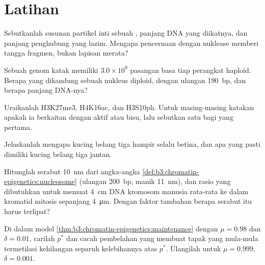 \section{Latihan}

\begin{exercise}[$\star$]\label{exo:b3:chromatin-epigenetics:1}
Sebutkanlah susunan partikel inti sebuah , panjang DNA yang
diikatnya, dan panjang penghubung yang lazim. Mengapa pencernaan 
dengan nuklease memberi tangga fragmen, bukan lapisan merata?
\end{exercise}

\begin{exercise}[$\star$]\label{exo:b3:chromatin-epigenetics:2}
Sebuah genom katak memiliki $3.0\times 10^{9}$ pasangan basa tiap perangkat
haploid. Berapa  yang dikandung sebuah nukleus diploid, dengan
ulangan \qty{190}{bp}, dan berapa panjang DNA-nya?
\end{exercise}

\begin{exercise}[$\star$]\label{exo:b3:chromatin-epigenetics:3}
Uraikanlah H3K27me3, H4K16ac, dan H3S10ph. Untuk masing-masing katakan apakah
ia berkaitan dengan  aktif atau bisu, lalu sebutkan satu  bagi
yang pertama.
\end{exercise}

\begin{exercise}[$\star$]\label{exo:b3:chromatin-epigenetics:4}
Jelaskanlah mengapa kucing belang tiga hampir selalu betina, dan apa yang
pasti dimiliki kucing belang tiga jantan.
\end{exercise}

\begin{exercise}[$\star\star$]\label{exo:b3:chromatin-epigenetics:5}
Hitunglah  serabut \qty{10}{nm} dari angka-angka
\cref{def:b3:chromatin-epigenetics:nucleosome} (ulangan \qty{200}{bp},
manik \qty{11}{nm}), dan rasio yang dibutuhkan untuk memuat \qty{4}{cm} DNA
kromosom manusia rata-rata ke dalam kromatid mitosis sepanjang
\qty{4}{\micro m}. Dengan faktor tambahan berapa serabut itu harus terlipat?
\end{exercise}

\begin{exercise}[$\star\star$]\label{exo:b3:chromatin-epigenetics:6}
Di dalam model \cref{thm:b3:chromatin-epigenetics:maintenance} dengan
$\mu = 0.98$ dan $\delta = 0.01$, carilah $p^{*}$ dan cacah pembelahan yang
membuat tapak yang mula-mula termetilasi kehilangan separuh kelebihannya
atas $p^{*}$. Ulangilah untuk $\mu = 0.999$, $\delta = 0.001$.
\end{exercise}


